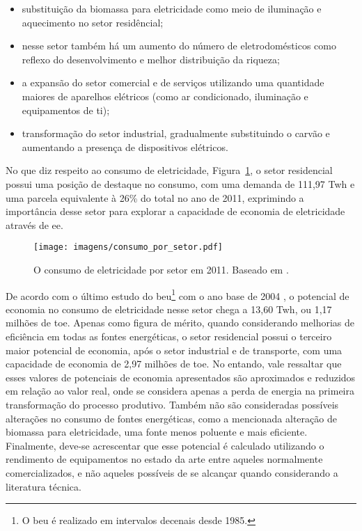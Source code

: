 \begin{itemize}
\item substituição da biomassa para eletricidade como meio de iluminação 
e aquecimento
no setor residêncial;
\item nesse setor também há um aumento do número de eletrodomésticos como
reflexo do desenvolvimento e melhor distribuição da riqueza;
\item a expansão do setor comercial e de serviços utilizando uma quantidade
maiores de aparelhos elétricos (como ar condicionado, iluminação e equipamentos
de \acrshort{ti}); 
\item transformação do setor industrial, gradualmente substituindo o carvão e 
aumentando a presença de dispositivos elétricos.
\end{itemize}

No que diz respeito ao consumo de eletricidade, 
Figura~\ref{fig:eletricidade_por_setor}, 
o setor residencial possui uma posição de destaque no consumo, com uma demanda
de 111,97 T\acrshort{wh} e uma parcela equivalente à 26\% do total no ano de 2011, 
exprimindo a importância desse setor para explorar a capacidade de economia de 
eletricidade através de \gls{ee}. 

\begin{figure}[h!t]
\centering
\texttt{[image: imagens/consumo\_por\_setor.pdf]}
\caption[Consumo de eletricidade por setor em 2011.]
{O consumo de eletricidade por setor em 2011. Baseado em \cite{ben2012}.}
\label{fig:eletricidade_por_setor}
\end{figure}

De acordo com o último estudo do \gls{beu}\footnote{O \gls{beu} é realizado em
intervalos decenais desde 1985.} com o ano base de 2004 \cite{beu}, o potencial de 
economia no consumo de eletricidade nesse setor chega a 13,60 T\acrshort{wh}, 
ou 1,17 milhões de \acrshort{toe}. Apenas como figura de mérito, quando considerando 
melhorias de eficiência em todas as fontes energéticas, o setor residencial
possui o terceiro maior potencial de economia, após o setor industrial e de
transporte, com uma capacidade de economia de 2,97 milhões de 
\acrshort{toe}. No entando, vale ressaltar que esses valores de potenciais de economia 
apresentados são aproximados e reduzidos em relação ao valor real, onde se
considera apenas a perda de energia na primeira transformação do processo
produtivo. Também não são consideradas possíveis alterações no consumo de fontes
energéticas, como a mencionada alteração de biomassa para eletricidade, uma
fonte menos poluente e mais eficiente. Finalmente, deve-se acrescentar que 
esse potencial é calculado utilizando o rendimento de equipamentos no estado 
da arte entre aqueles normalmente comercializados, e não aqueles possíveis de 
se alcançar quando considerando a literatura técnica.

